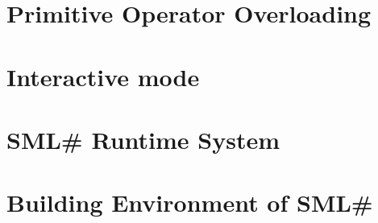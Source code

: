 \documentclass{jbook}
\newcommand{\txt}[2]{#2}
\newcommand{\smlsharp}{SML\#}
\begin{document}
\chapter{\txt
{オーバーロード演算子の処理}
{Primitive Operator Overloading}
}
\label{chap:primitiveoverloading}

\chapter{\txt
{対話型環境}
{Interactive mode}
}
\label{chap:interactivemode}

\chapter{\txt
{\smlsharp{}の実行時処理系}
{\smlsharp{} Runtime System }
}
\label{chap:runtimesystem}

\chapter{\txt
{\smlsharp{}のビルド環境}
{Building Environment of \smlsharp{}}
}
\label{chap:buildsystem}

\fi%


% 
\end{document}
